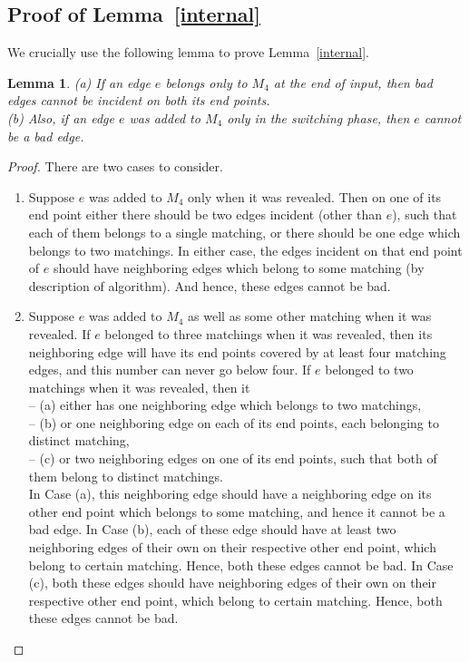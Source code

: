 \documentclass[11pt]{article}
\newtheorem{lemma}[theorem]{Lemma}
\begin{document}


\begin{appendix}

 \section{Proof of Lemma~\ref{internal}}\label{pf_inbad}
 We crucially use the following lemma to prove Lemma~\ref{internal}.
 \begin{lemma}\label{M4bad}
  (a) If an edge $e$ belongs only to $M_4$ at the end of input, then bad edges cannot be incident on both its end points.\\
  (b) Also, if an edge $e$ was added to $M_4$ only in the switching phase, then $e$ cannot be a bad edge.
 \end{lemma}
 \begin{proof}
  There are two cases to consider.
  \begin{enumerate}
   \item Suppose $e$ was added to $M_4$ only when it was revealed. Then on one of its end point either there should be two edges incident (other than $e$), such that each of them belongs to a single matching, or there should be one edge which belongs to two matchings. In either case, the edges incident on that end point of $e$ should have neighboring edges which belong to some matching (by description of algorithm). And hence, these edges cannot be bad.
   \item Suppose $e$ was added to $M_4$ as well as some other matching when it was revealed. If $e$ belonged to three matchings when it was revealed, then its neighboring edge will have its end points covered by at least four matching edges, and this number can never go below four. If $e$ belonged to two matchings when it was revealed, then it\\
   -- (a) either has one neighboring edge which belongs to two matchings,\\
   -- (b) or one neighboring edge on each of its end points, each belonging to distinct matching,\\
   -- (c) or two neighboring edges on one of its end points, such that both of them belong to distinct matchings.\\
   In Case (a), this neighboring edge should have a neighboring edge on its other end point which belongs to some matching, and hence it cannot be a bad edge. In Case (b), each of these edge should have at least two neighboring edges of their own on their respective other end point, which belong to certain matching. Hence, both these edges cannot be bad. In Case (c), both these edges should have neighboring edges of their own on their respective other end point, which belong to certain matching. Hence, both these edges cannot be bad.

\end{enumerate}
\end{proof}
\end{appendix}
\end{document}
